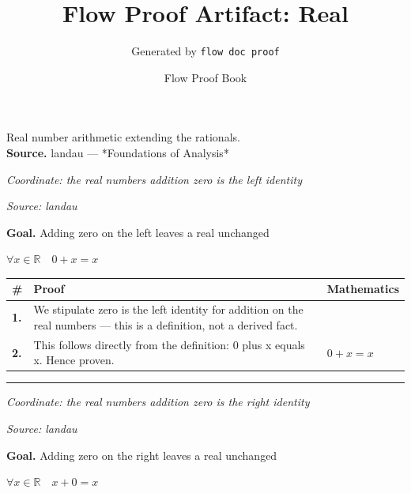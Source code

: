 \documentclass[11pt]{article}
\title{Flow Proof Artifact: Real}
\author{Generated by \texttt{flow doc proof}}
\date{Flow Proof Book}
\theoremstyle{definition}
\begin{document}
\maketitle
Real number arithmetic extending the rationals.\\[0.5em]
\textbf{Source.} landau — *Foundations of Analysis*\\[0.5em]
\bigskip
{}\par
\smallskip\noindent\textit{Coordinate: the real numbers \cdot addition \cdot zero is the left identity}\par
\smallskip\noindent\textit{Source: landau}\par
\medskip
\noindent\textbf{Goal.} Adding zero on the left leaves a real unchanged\par
\noindent$\displaystyle \forall x \in \mathbb{R}\quad 0 + x = x$\par
\medskip
\noindent
\begin{tabular}{@{} >{\raggedright\arraybackslash}p{} >{\raggedright\arraybackslash}p{} >{\raggedleft\arraybackslash}p{} @{}}
\textbf{\#} & \textbf{Proof} & \textbf{Mathematics} \\
\midrule
\textbf{1.} & We stipulate zero is the left identity for addition on the real numbers — this is a definition, not a derived fact. & \\[0.45em]
\textbf{2.} & This follows directly from the definition: 0 plus x equals x. Hence proven. & $\displaystyle 0 + x = x$ \\[0.45em]
\bottomrule
\end{tabular}
\label{thm:Real-addition-zero_is_the_left_identity}
\par\medskip\hrule
\bigskip
{}\par
\smallskip\noindent\textit{Coordinate: the real numbers \cdot addition \cdot zero is the right identity}\par
\smallskip\noindent\textit{Source: landau}\par
\medskip
\noindent\textbf{Goal.} Adding zero on the right leaves a real unchanged\par
\noindent$\displaystyle \forall x \in \mathbb{R}\quad x + 0 = x$\par
\end{document}
